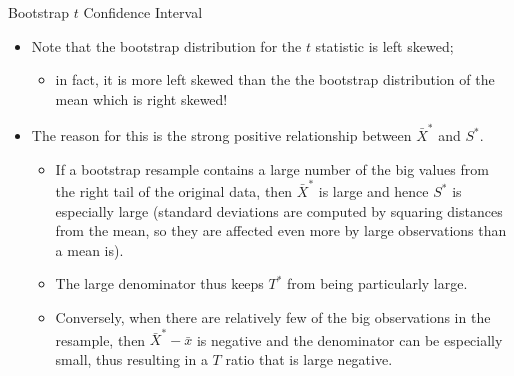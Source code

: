 \documentclass[
  ignorenonframetext,
]{beamer}
\providecommand{\tightlist}{%
  \setlength{\itemsep}{0pt}\setlength{\parskip}{0pt}}
\begin{document}
\begin{frame}{Bootstrap \(t\) Confidence Interval}
\protect\hypertarget{bootstrap-t-confidence-interval-7}{}
\begin{itemize}
\item
  Note that the bootstrap distribution for the \(t\) statistic is left
  skewed;

  \begin{itemize}
  \tightlist
  \item
    in fact, it is more left skewed than the the bootstrap distribution
    of the mean which is right skewed!
  \end{itemize}
\item
  The reason for this is the strong positive relationship between
  \(\bar{X}^*\) and \(S^*\).

  \begin{itemize}
  \tightlist
  \item
    If a bootstrap resample contains a large number of the big values
    from the right tail of the original data, then \(\bar{X}^*\) is
    large and hence \(S^*\) is especially large (standard deviations are
    computed by squaring distances from the mean, so they are affected
    even more by large observations than a mean is).
  \item
    The large denominator thus keeps \(T^*\) from being particularly
    large.
  \item
    Conversely, when there are relatively few of the big observations in
    the resample, then \(\bar{X}^*-\bar{x}\) is negative and the
    denominator can be especially small, thus resulting in a \(T\) ratio
    that is large negative.
  \end{itemize}
\end{itemize}
\end{frame}
\end{document}
